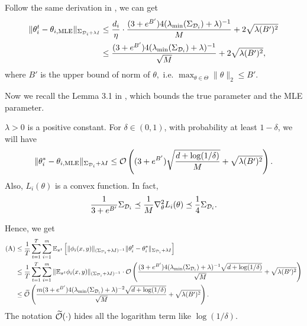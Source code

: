 Follow the same derivation in \citep{cen2024value}, we can get 
\begin{align*}
    \|\theta_i^t - \theta_{i,\mathrm{MLE}}\|_{\Sigma_{\mathcal{D}_i + \lambda  I}} &\le \frac{d_i}{\eta} \cdot \frac{(3+e^{B'})4(\lambda_{\min}(\Sigma_{\mathcal{D}_i}) + \lambda)^{-1}}{M} + 2\sqrt{
    \lambda (B')^2
    }\\
    &\le \frac{(3+e^{B'})4(\lambda_{\min}(\Sigma_{\mathcal{D}_i}) + \lambda)^{-1}}{\sqrt{M}} + 2\sqrt{
    \lambda (B')^2},
\end{align*}
where $B'$ is the upper bound of norm of $\theta,$ i.e. $\max_{\theta \in \Theta}\|\theta\|_2 \le B'.$

Now we recall the Lemma 3.1 in \citep{zhu2023principled}, which bounds the true parameter and the MLE parameter. 
\begin{lemma} $\lambda>0$ is a positive constant. For $\delta \in (0,1)$, with probability at least $1-\delta$, we will have
    \begin{align*}
    \|\theta_i^* - \theta_{i,\mathrm{MLE}}\|_{\Sigma_{\mathcal{D}_i} + \lambda I } \le \mathcal{O}\left((3+e^{B'})\sqrt{\frac{d+\log(1/\delta)}{M}} + \sqrt{\lambda (B')^2}\right).
\end{align*}
Also, $L_i(\theta)$ is a convex function. In fact, 
\begin{align*}
    \frac{1}{3+e^{B'}}\Sigma_{\mathcal{D}_i} \preceq \frac{1}{M}\nabla_\theta^2 L_i(\theta) \preceq \frac{1}{4}\Sigma_{\mathcal{D}_i}.
\end{align*}
\end{lemma}
Hence, we get
\begin{align*}
    \text{(A)} &\le \frac{1}{T}\sum_{t=1}^T \sum_{i=1}^m\mathbb{E}_{\pi^t}\left[\|\phi_i(x,y)\|_{(\Sigma_{\mathcal{D}_i}+\lambda I)^{-1}} \|\theta_i^t - \theta_i^*\|_{\Sigma_{\mathcal{D}_i}+\lambda I } \right]\\
    &\le \frac{1}{T}\sum_{t=1}^T \sum_{i=1}^m \|\mathbb{E}_{\pi^t}\phi_i(x,y)\|_{(\Sigma_{\mathcal{D}_i}+\lambda I)^{-1}} \cdot \mathcal{O}\left(\frac{(3+e^{B'})4(\lambda_{\min}(\Sigma_{\mathcal{D}_i}) + \lambda)^{-1}\sqrt{d+\log(1/\delta)}}{\sqrt{M}}+\sqrt{\lambda (B')^2}\right)\\
    &\le \widetilde{\mathcal{O}}\left(\frac{m(3+e^{B'})4(\lambda_{\min}(\Sigma_{\mathcal{D}_i}) + \lambda)^{-2}\sqrt{d+\log(1/\delta)}}{\sqrt{M}}+\sqrt{\lambda (B')^2}\right).
\end{align*}
The notation $\widetilde{\mathcal{O}}(\cdot)$ hides all the logarithm term like $\log(1/\delta)$.

